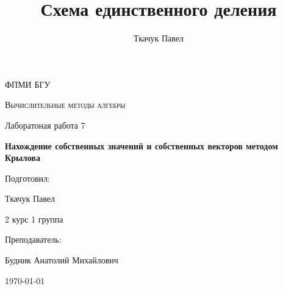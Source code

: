 \documentclass[11.4pt]{article}
\author{Ткачук Павел}
\title{Схема единственного деления}
\begin{document}
	\begin{titlepage}
		
		\centering
		{\scshape\LARGE ФПМИ БГУ \par}
		\vfill
		\begin{flushleft}
		{\scshape\Large Вычислительные методы алгебры\par Лаборатоная работа 7 \par}
		\vspace{1cm}
		{\huge\bfseries Нахождение собственных значений и собственных векторов методом Крылова\par}
		\end{flushleft}
		\vspace{10cm}
		\begin{flushright}
		\large
		Подготовил:\par
		Ткачук Павел\par
		2 курс 1 группа\par
		\vspace{0.5cm}
		Преподаватель:\par
		Будник Анатолий Михайлович
		\end{flushright}
		
		\vfill
		{\large \today}
	\end{titlepage}
\end{document}
